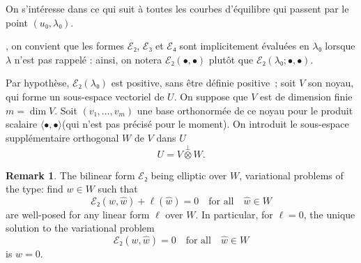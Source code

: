 \documentclass[12pt, final]{scrartcl}
\theoremstyle{definition}
\newtheorem{remark}{Remark}
\newcommand{\E}{\mathcal E}
\begin{document}
On s'intéresse dans ce qui suit à toutes les courbes d'équilibre qui passent par
le point $(u₀, λ₀)$.

, on
convient que les formes $\E₂$, $\E₃$ et $\E₄$ sont implicitement évaluées en
$λ₀$ lorsque $λ$ n'est pas rappelé : ainsi, on notera $\E₂(•, •)$ plutôt
que $\E₂(λ₀ ; •, •)$.

Par hypothèse, $\E₂(λ₀)$ est positive, sans être définie
positive~; soit $V$ son noyau, qui forme un sous-espace vectoriel de $U$. On
suppose que $V$ est de dimension finie $m = \dim V$. Soit
$(v₁, \ldots, v_m)$ une base orthonormée de ce noyau pour le produit scalaire
$〈 •, • 〉$(qui n'est pas précisé pour le moment). On introduit le
sous-espace supplémentaire orthogonal $W$ de $V$ dans $U$
\begin{equation}
  U = V \overset{\perp}{\otimes} W.
\end{equation}

\begin{remark}
  \label{rem:20220902095055}
  The bilinear form $\E₂$ being elliptic over $W$, variational problems of the
  type: find $w ∈ W$ such that
  \begin{equation}
    \E₂(w, \hat{w})+\ell(\hat{w}) = 0 \quad \text{for all} \quad \hat{w}∈W
  \end{equation}
  are well-posed for any linear form $\ell$ over $W$. In particular, for
  $\ell=0$, the unique solution to the variational problem
  \begin{equation}
    \E₂(w, \hat{w}) = 0 \quad \text{for all} \quad \hat{w}∈W
  \end{equation}
  is $w = 0$.
\end{remark}
\end{document}
